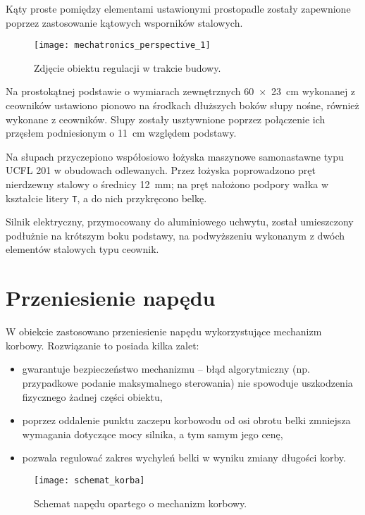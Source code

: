 Kąty proste pomiędzy elementami ustawionymi prostopadle zostały zapewnione poprzez zastosowanie kątowych wsporników stalowych.

\begin{figure}[H]
	\centering
	\texttt{[image: mechatronics\_perspective\_1]}
	\caption{Zdjęcie obiektu regulacji w trakcie budowy.}
	\label{fig:mechatronics_perspective_1}
\end{figure}

Na prostokątnej podstawie o wymiarach zewnętrznych \SI{60 x 23}{cm} wykonanej z ceowników ustawiono pionowo na środkach dłuższych boków słupy nośne, również wykonane z ceowników. Słupy zostały usztywnione poprzez połączenie ich przęsłem podniesionym o \SI{11}{cm} względem podstawy.

Na słupach przyczepiono współosiowo łożyska maszynowe samonastawne typu UCFL 201 w obudowach odlewanych. Przez łożyska poprowadzono pręt nierdzewny stalowy o średnicy \SI{12}{mm}; na pręt nałożono podpory wałka w kształcie litery \texttt{T}, a do nich przykręcono belkę.

Silnik elektryczny, przymocowany do aluminiowego uchwytu, został umieszczony podłużnie na krótszym boku podstawy, na podwyższeniu wykonanym z dwóch elementów stalowych typu ceownik.


\section{Przeniesienie napędu}
\label{sec:ch2_przeniesienie_napedu}

W obiekcie zastosowano przeniesienie napędu wykorzystujące mechanizm korbowy. Rozwiązanie to posiada kilka zalet:

\begin{itemize}
	\item gwarantuje bezpieczeństwo mechanizmu -- błąd algorytmiczny (np. przypadkowe podanie maksymalnego sterowania) nie spowoduje uszkodzenia fizycznego żadnej części obiektu,
	\item poprzez oddalenie punktu zaczepu korbowodu od osi obrotu belki zmniejsza wymagania dotyczące mocy silnika, a tym samym jego cenę,
	\item pozwala regulować zakres wychyleń belki w wyniku zmiany długości korby.
\end{itemize}

\begin{figure}[H]
	\centering
    \texttt{[image: schemat\_korba]}
	\caption{Schemat napędu opartego o mechanizm korbowy.}
	\label{fig:schemat_korba}
\end{figure}


